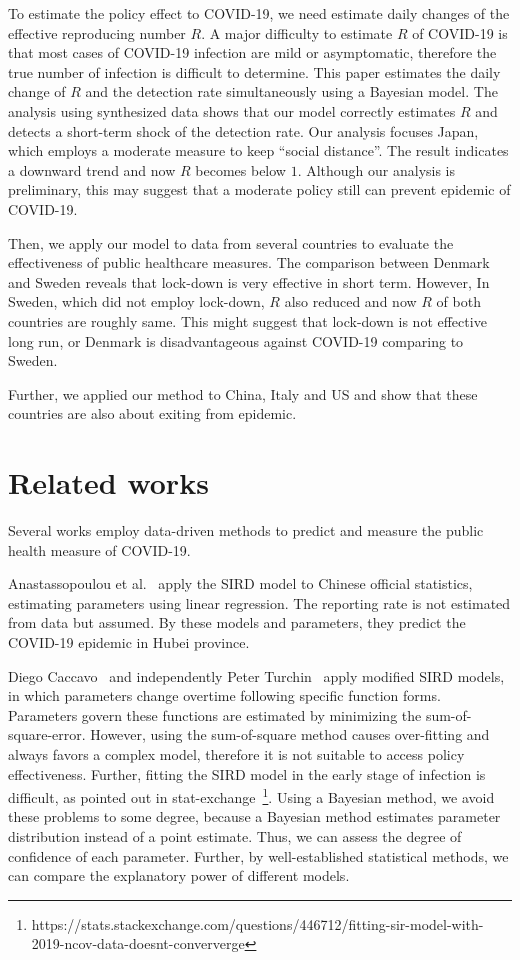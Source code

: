 \documentclass{amsart}
\begin{document}
To estimate the policy effect to COVID-19, we need estimate daily changes of the effective reproducing number $R$.
A major difficulty to estimate $R$ of COVID-19 is that most cases of COVID-19 infection are mild or asymptomatic, therefore the true number of infection is difficult to determine.
This paper estimates the daily change of $R$ and the detection rate simultaneously using a Bayesian model.
The analysis using synthesized data shows that our model correctly estimates $R$ and detects a short-term shock of the detection rate.
Our analysis focuses Japan, which employs a moderate measure to keep ``social distance''.
The result indicates a downward trend and now $R$ becomes below $1$.
Although our analysis is preliminary, this may suggest that a moderate policy still can prevent epidemic of COVID-19.

Then, we apply our model to data from several countries to evaluate the effectiveness of public healthcare measures.
The comparison between Denmark and Sweden reveals that lock-down is very effective in short term.
However, In Sweden, which did not employ lock-down, $R$ also reduced and now $R$ of both countries are roughly same.
This might suggest that lock-down is not effective long run, or Denmark is disadvantageous against COVID-19 comparing to Sweden.

Further, we applied our method to China, Italy and US and show that these countries are also about exiting from epidemic.

\section{Related works}

Several works employ data-driven methods to predict and measure the public health measure of COVID-19.

Anastassopoulou et al.~\cite{Anastassopoulou2020} apply the SIRD model to Chinese official statistics, estimating parameters using linear regression.
The reporting rate is not estimated from data but assumed.
By these models and parameters, they predict the COVID-19 epidemic in Hubei province.

Diego Caccavo~\cite{Caccavo2020} and independently Peter Turchin~\cite{Turchin2020} apply modified SIRD models, in which parameters change overtime following specific function forms.
Parameters govern these functions are estimated by minimizing the sum-of-square-error.
However, using the sum-of-square method causes over-fitting and always favors a complex model, therefore it is not suitable to access policy effectiveness.
Further, fitting the SIRD model in the early stage of infection is difficult, as pointed out in stat-exchange~\footnote{https://stats.stackexchange.com/questions/446712/fitting-sir-model-with-2019-ncov-data-doesnt-conververge}.
Using a Bayesian method, we avoid these problems to some degree, because a Bayesian method estimates parameter distribution instead of a point estimate.
Thus, we can assess the degree of confidence of each parameter.
Further, by well-established statistical methods, we can compare the explanatory power of different models.
\end{document}
